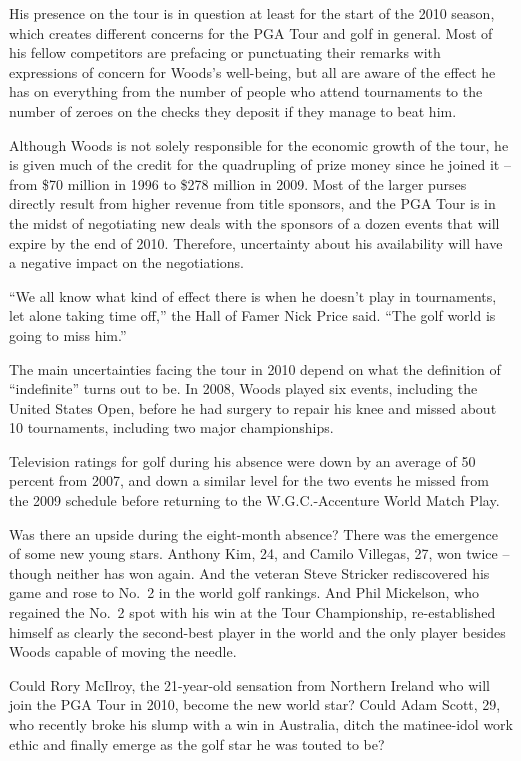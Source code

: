 ﻿\documentclass[12pt]{article}
\begin{document}
His presence on the tour is in question at least for the start of the 2010 season, which creates
different concerns for the PGA Tour and golf in general. Most of his fellow competitors are
prefacing or punctuating their remarks with expressions of concern for Woods's well-being, but all
are aware of the effect he has on everything from the number of people who attend tournaments to the
number of zeroes on the checks they deposit if they manage to beat him.

Although Woods is not solely responsible for the economic growth of the tour, he is given much of
the credit for the quadrupling of prize money since he joined it -- from \$70 million in 1996 to
\$278 million in 2009. Most of the larger purses directly result from higher revenue from title
sponsors, and the PGA Tour is in the midst of negotiating new deals with the sponsors of a dozen
events that will expire by the end of 2010. Therefore, uncertainty about his availability will have
a negative impact on the negotiations.

``We all know what kind of effect there is when he doesn't play in tournaments, let alone taking
time off,'' the Hall of Famer Nick Price said. ``The golf world is going to miss him.''

The main uncertainties facing the tour in 2010 depend on what the definition of ``indefinite'' turns
out to be. In 2008, Woods played six events, including the United States Open, before he had surgery
to repair his knee and missed about 10 tournaments, including two major championships.

Television ratings for golf during his absence were down by an average of 50 percent from 2007, and
down a similar level for the two events he missed from the 2009 schedule before returning to the
W.G.C.-Accenture World Match Play.

Was there an upside during the eight-month absence? There was the emergence of some new young stars.
Anthony Kim, 24, and Camilo Villegas, 27, won twice -- though neither has won again. And the veteran
Steve Stricker rediscovered his game and rose to No.~2 in the world golf rankings. And Phil
Mickelson, who regained the No.~2 spot with his win at the Tour Championship, re-established himself
as clearly the second-best player in the world and the only player besides Woods capable of moving
the needle.

Could Rory McIlroy, the 21-year-old sensation from Northern Ireland who will join the PGA Tour in
2010, become the new world star? Could Adam Scott, 29, who recently broke his slump with a win in
Australia, ditch the matinee-idol work ethic and finally emerge as the golf star he was touted to
be?
\end{document}
